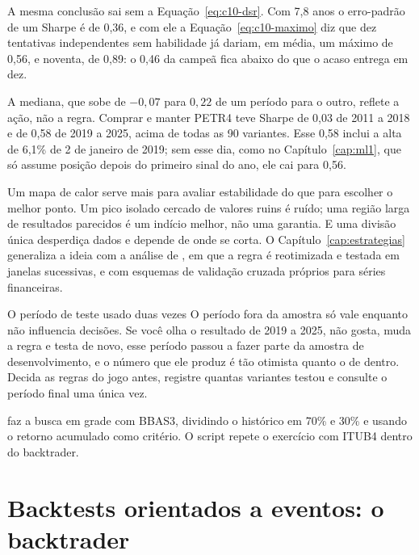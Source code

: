 A mesma conclusão sai sem a Equação~\eqref{eq:c10-dsr}. Com 7,8 anos o erro-padrão de um Sharpe é de 0,36, e com ele a Equação~\eqref{eq:c10-maximo} diz que dez tentativas independentes sem habilidade já dariam, em média, um máximo de 0,56, e noventa, de 0,89: o 0,46 da campeã fica abaixo do que o acaso entrega em dez.

A mediana, que sobe de $-0,07$ para $0,22$ de um período para o outro, reflete a ação, não a regra. Comprar e manter PETR4 teve Sharpe de 0,03 de 2011 a 2018 e de 0,58 de 2019 a 2025, acima de todas as 90 variantes. Esse 0,58 inclui a alta de 6,1\% de 2 de janeiro de 2019; sem esse dia, como no Capítulo~\ref{cap:ml1}, que só assume posição depois do primeiro sinal do ano, ele cai para 0,56.

Um mapa de calor serve mais para avaliar estabilidade do que para escolher o melhor ponto. Um pico isolado cercado de valores ruins é ruído; uma região larga de resultados parecidos é um indício melhor, não uma garantia. E uma divisão única desperdiça dados e depende de onde se corta. O Capítulo~\ref{cap:estrategias} generaliza a ideia com a análise  de \citet{pardo2008}, em que a regra é reotimizada e testada em janelas sucessivas, e com esquemas de validação cruzada próprios para séries financeiras.

\begin{armadilha}{O período de teste usado duas vezes}
O período fora da amostra só vale enquanto não influencia decisões. Se você olha o resultado de 2019 a 2025, não gosta, muda a regra e testa de novo, esse período passou a fazer parte da amostra de desenvolvimento, e o número que ele produz é tão otimista quanto o de dentro. Decida as regras do jogo antes, registre quantas variantes testou e consulte o período final uma única vez.
\end{armadilha}

\begin{repositorio}
 faz a busca em grade com BBAS3, dividindo o histórico em 70\% e 30\% e usando o retorno acumulado como critério. O script  repete o exercício com ITUB4 dentro do backtrader.
\end{repositorio}

\section{Backtests orientados a eventos: o backtrader}
\label{sec:c10-backtrader}

